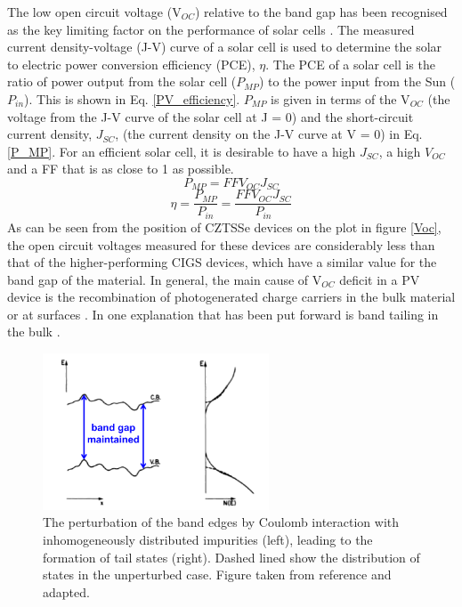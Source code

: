 \documentclass[11pt, twoside]{report}
\begin{document}
The low open circuit voltage (V$_{OC}$) relative to the band gap has been recognised as the key limiting factor on the performance of {\CZTS} solar cells \cite{culprit}. 
The measured current density-voltage (J-V) curve of a solar cell is used to determine the solar to electric power conversion efficiency (PCE), $\eta$. The PCE of a solar cell is the ratio of power output from the solar cell ($P_{MP}$) to the power input from the Sun ($P_{in}$). This is shown in Eq. \ref{PV_efficiency}. $P_{MP}$ is given in terms of the V$_{OC}$ (the voltage from the J-V curve of the solar cell at J = 0) and the short-circuit current density, $J_{SC}$, (the current density on the J-V curve at V = 0) in Eq. \ref{P_MP}.
For an efficient solar cell, it is desirable to have a high $J_{SC}$, a high $V_{OC}$ and a FF that is as close to 1 as possible.
\begin{equation} \label{P_MP}
P_{MP} = FFV_{OC}J_{SC}
\end{equation}
\begin{equation} \label{PV_efficiency}
\eta = \frac{P_{MP}}{P_{in}} = \frac{FFV_{OC}J_{SC}}{P_{in}}
\end{equation}
As can be seen from the position of CZTSSe devices on the plot in figure \ref{Voc}, the open circuit voltages measured for these devices are considerably less than that of the higher-performing CIGS devices, which have a similar value for the band gap of the material.
In general, the main cause of V$_{OC}$ deficit in a PV device is the recombination of photogenerated charge carriers in the bulk material or at surfaces \cite{culprit}. In {\CZTS} one explanation that has been put forward is band tailing in the bulk \cite{band_tail}.


\begin{figure}[h!]
  \centering
    \includegraphics[width=0.6\textwidth]{figures/pankove_elec_fluc.png}
    \caption[The perturbation of the band edges by Coulomb interaction with inhomogeneously distributed impurities (left), leading to the formation of tail states (right). Dashed lined show the distribution of states in the unperturbed case]{The perturbation of the band edges by Coulomb interaction with inhomogeneously distributed impurities (left), leading to the formation of tail states (right). Dashed lined show the distribution of states in the unperturbed case. Figure taken from reference  and adapted.}
  \label{pankove_elec_fluc}
\end{figure}
\end{document}
